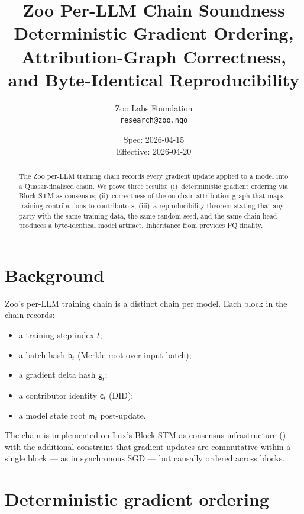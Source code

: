 \documentclass[11pt]{article}
\title{Zoo Per-LLM Chain Soundness\\
{\large Deterministic Gradient Ordering, Attribution-Graph
Correctness, and Byte-Identical Reproducibility}}
\author{Zoo Labs Foundation\\
\texttt{research@zoo.ngo}}
\date{Spec: 2026-04-15 \\ Effective: 2026-04-20}
\begin{document}
\maketitle

\begin{abstract}
The Zoo per-LLM training chain records every gradient update applied
to a model into a Quasar-finalised chain. We prove three results:
(i)~deterministic gradient ordering via Block-STM-as-consensus;
(ii)~correctness of the on-chain attribution graph that maps
training contributions to contributors; (iii)~a reproducibility
theorem stating that any party with the same training data, the same
random seed, and the same chain head produces a byte-identical model
artifact. Inheritance from \cite{quasar-cert} provides PQ finality.
\end{abstract}

\tableofcontents

\section{Background}
\label{sec:bg}

Zoo's per-LLM training chain is a distinct chain per model. Each
block in the chain records:
\begin{itemize}[nosep]
  \item a training step index $t$;
  \item a batch hash $\mathsf{b}_t$ (Merkle root over input batch);
  \item a gradient delta hash $\mathsf{g}_t$;
  \item a contributor identity $\mathsf{c}_t$ (DID);
  \item a model state root $\mathsf{m}_t$ post-update.
\end{itemize}

The chain is implemented on Lux's Block-STM-as-consensus
infrastructure (\cite{dagevm-lean}) with the additional constraint
that gradient updates are commutative within a single block --- as in
synchronous SGD --- but causally ordered across blocks.

\section{Deterministic gradient ordering}
\label{sec:order}
\end{document}

